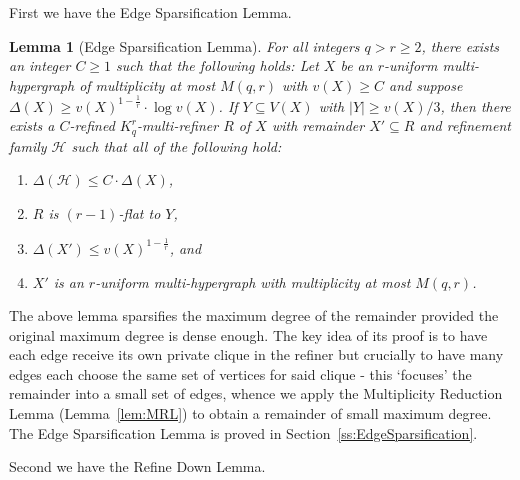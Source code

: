 \documentclass[11pt]{article}
\newcounter{i}
\theoremstyle{plain}
\newtheorem{lem}[thm]{Lemma}
\theoremstyle{plain} %
\theoremstyle{definition}
\begin{document}
First we have the Edge Sparsification Lemma. 

\begin{lem}[Edge Sparsification Lemma]\label{lem:Sparsify}
For all integers $q > r\ge 2$, there exists an integer $C \ge 1$ such that the following holds: Let $X$ be an $r$-uniform multi-hypergraph of multiplicity at most $M(q,r)$ with $v(X)\ge C$ and suppose $\Delta(X)\ge v(X)^{1-\frac{1}{r}}\cdot \log v(X)$. If $Y\subseteq V(X)$ with $|Y|\ge v(X)/3$, then there exists a $C$-refined $K_q^r$-multi-refiner $R$ of $X$ with remainder $X'\subseteq R$ and refinement family $\mathcal{H}$ such that all of the following hold:

\begin{enumerate}
    \item[(1)] $\Delta(\mathcal{H}) \le C \cdot  \Delta(X)$,
    \item[(2)] $R$ is $(r-1)$-flat to $Y$,
    \item[(3)] $\Delta(X')\le v(X)^{1-\frac{1}{r}}$, and
    \item[(4)] $X'$ is an $r$-uniform multi-hypergraph with multiplicity at most $M(q,r)$.
\end{enumerate}      
\end{lem}

The above lemma sparsifies the maximum degree of the remainder provided the original maximum degree is dense enough. The key idea of its proof is to have each edge receive its own private clique in the refiner but crucially to have many edges each choose the same set of vertices for said clique - this `focuses' the remainder into a small set of edges, whence we apply the Multiplicity Reduction Lemma (Lemma~\ref{lem:MRL}) to obtain a remainder of small maximum degree. The Edge Sparsification Lemma is proved in Section~\ref{ss:EdgeSparsification}.

Second we have the Refine Down Lemma. 
\end{document}
